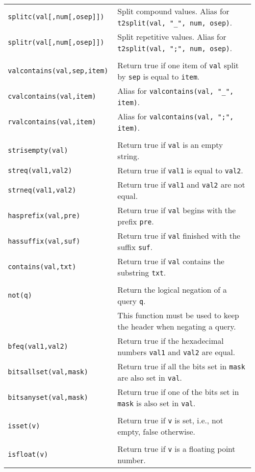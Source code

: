 \documentclass[documentation]{subfiles}
\begin{document}
\begin{longtable}{>{\tt}ll}
    splitc(val[,num[,osep]])    & Split compound values. Alias for {\tt t2split(val, "\_", num, osep)}.\\
    splitr(val[,num[,osep]])    & Split repetitive values. Alias for {\tt t2split(val, ";", num, osep)}.\\
    \\
    valcontains(val,sep,item)   & Return true if one item of {\tt val} split by {\tt sep} is equal to {\tt item}.\\
    cvalcontains(val,item)      & Alias for {\tt valcontains(val, "\_", item)}.\\
    rvalcontains(val,item)      & Alias for {\tt valcontains(val, ";", item)}.\\
    \\
    strisempty(val)             & Return true if {\tt val} is an empty string.\\
    streq(val1,val2)            & Return true if {\tt val1} is equal to {\tt val2}.\\
    strneq(val1,val2)           & Return true if {\tt val1} and {\tt val2} are not equal.\\
    hasprefix(val,pre)          & Return true if {\tt val} begins with the prefix {\tt pre}.\\
    hassuffix(val,suf)          & Return true if {\tt val} finished with the suffix {\tt suf}.\\
    contains(val,txt)           & Return true if {\tt val} contains the substring {\tt txt}.\\
    \\
    not(q)                      & Return the logical negation of a query {\tt q}.\\
                                & This function must be used to keep the header when negating a query.\\
    bfeq(val1,val2)             & Return true if the hexadecimal numbers {\tt val1} and {\tt val2} are equal.\\
    bitsallset(val,mask)        & Return true if all the bits set in {\tt mask} are also set in {\tt val}.\\
    bitsanyset(val,mask)        & Return true if one of the bits set in {\tt mask} is also set in {\tt val}.\\
    \\
    isset(v)                    & Return true if {\tt v} is set, i.e., not empty, false otherwise.\\
    \\
    isfloat(v)                  & Return true if {\tt v} is a floating point number.\\

\end{longtable}
\end{document}
